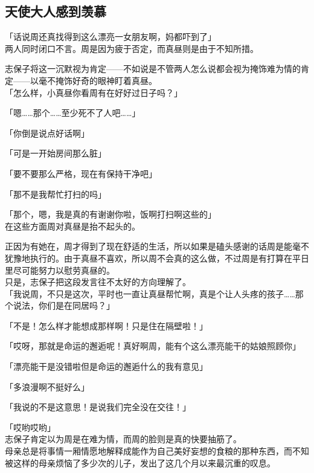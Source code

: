 \subsection{天使大人感到羡慕}

「话说周还真找得到这么漂亮一女朋友啊，妈都吓到了」\\

两人同时闭口不言。周是因为疲于否定，而真昼则是由于不知所措。

志保子将这一沉默视为肯定——不如说是不管两人怎么说都会视为掩饰难为情的肯定——以毫不掩饰好奇的眼神盯着真昼。\\

「怎么样，小真昼你看周有在好好过日子吗？」

「嗯……那个……至少死不了人吧……」

「你倒是说点好话啊」

「可是一开始房间那么脏」

「要不要那么严格，现在有保持干净吧」

「那不是我帮忙打扫的吗」

「那个，嗯，我是真的有谢谢你啦，饭啊打扫啊这些的」\\

在这些方面周对真昼是抬不起头的。

正因为有她在，周才得到了现在舒适的生活，所以如果是磕头感谢的话周是能毫不犹豫地执行的。由于真昼不喜欢，所以周不会真的这么做，不过周是有打算在平日里尽可能努力以慰劳真昼的。\\

只是，志保子把这段发言往不太好的方向理解了。\\

「我说周，不只是这次，平时也一直让真昼帮忙啊，真是个让人头疼的孩子……那个说法，你们是在同居吗？」

「不是！怎么样才能想成那样啊！只是住在隔壁啦！」

「哎呀，那就是命运的邂逅呢！真好啊周，能有个这么漂亮能干的姑娘照顾你」

「漂亮能干是没错啦但是命运的邂逅什么的我有意见」

「多浪漫啊不挺好么」

「我说的不是这意思！是说我们完全没在交往！」

「哎哟哎哟」\\

志保子肯定以为周是在难为情，而周的脸则是真的快要抽筋了。\\

母亲总是将事情一厢情愿地解释成能作为自己美好妄想的食粮的那种东西，而不知被这样的母亲烦恼了多少次的儿子，发出了这几个月以来最沉重的叹息。\\

